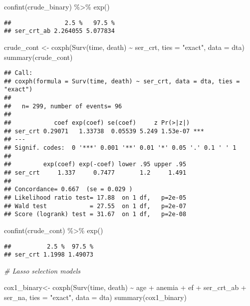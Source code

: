 \documentclass[
]{article}
\newenvironment{Shaded}{\begin{snugshade}}{\end{snugshade}}
\newcommand{\AttributeTok}[1]{\textcolor[rgb]{0.77,0.63,0.00}{#1}}
\newcommand{\CommentTok}[1]{\textcolor[rgb]{0.56,0.35,0.01}{\textit{#1}}}
\newcommand{\FunctionTok}[1]{\textcolor[rgb]{0.00,0.00,0.00}{#1}}
\newcommand{\NormalTok}[1]{#1}
\newcommand{\OtherTok}[1]{\textcolor[rgb]{0.56,0.35,0.01}{#1}}
\newcommand{\SpecialCharTok}[1]{\textcolor[rgb]{0.00,0.00,0.00}{#1}}
\newcommand{\StringTok}[1]{\textcolor[rgb]{0.31,0.60,0.02}{#1}}
\begin{document}
\begin{Shaded}
\begin{Highlighting}[]
\FunctionTok{confint}\NormalTok{(crude\_binary) }\SpecialCharTok{\%\textgreater{}\%} \FunctionTok{exp}\NormalTok{()}
\end{Highlighting}
\end{Shaded}

\begin{verbatim}
##               2.5 %   97.5 %
## ser_crt_ab 2.264055 5.077834
\end{verbatim}

\begin{Shaded}
\begin{Highlighting}[]
\NormalTok{crude\_cont }\OtherTok{\textless{}{-}} \FunctionTok{coxph}\NormalTok{(}\FunctionTok{Surv}\NormalTok{(time, death) }\SpecialCharTok{\textasciitilde{}}\NormalTok{ ser\_crt, }\AttributeTok{ties =} \StringTok{"exact"}\NormalTok{, }\AttributeTok{data =}\NormalTok{ dta)}
\FunctionTok{summary}\NormalTok{(crude\_cont)}
\end{Highlighting}
\end{Shaded}

\begin{verbatim}
## Call:
## coxph(formula = Surv(time, death) ~ ser_crt, data = dta, ties = "exact")
## 
##   n= 299, number of events= 96 
## 
##            coef exp(coef) se(coef)     z Pr(>|z|)    
## ser_crt 0.29071   1.33738  0.05539 5.249 1.53e-07 ***
## ---
## Signif. codes:  0 '***' 0.001 '**' 0.01 '*' 0.05 '.' 0.1 ' ' 1
## 
##         exp(coef) exp(-coef) lower .95 upper .95
## ser_crt     1.337     0.7477       1.2     1.491
## 
## Concordance= 0.667  (se = 0.029 )
## Likelihood ratio test= 17.88  on 1 df,   p=2e-05
## Wald test            = 27.55  on 1 df,   p=2e-07
## Score (logrank) test = 31.67  on 1 df,   p=2e-08
\end{verbatim}

\begin{Shaded}
\begin{Highlighting}[]
\FunctionTok{confint}\NormalTok{(crude\_cont) }\SpecialCharTok{\%\textgreater{}\%} \FunctionTok{exp}\NormalTok{()}
\end{Highlighting}
\end{Shaded}

\begin{verbatim}
##          2.5 %  97.5 %
## ser_crt 1.1998 1.49073
\end{verbatim}

\begin{Shaded}
\begin{Highlighting}[]
\CommentTok{\# Lasso selection models}

\NormalTok{cox1\_binary}\OtherTok{\textless{}{-}} \FunctionTok{coxph}\NormalTok{(}\FunctionTok{Surv}\NormalTok{(time, death) }\SpecialCharTok{\textasciitilde{}}\NormalTok{ age }\SpecialCharTok{+}\NormalTok{ anemia }\SpecialCharTok{+}\NormalTok{ ef }\SpecialCharTok{+}\NormalTok{ ser\_crt\_ab }\SpecialCharTok{+}\NormalTok{ ser\_na, }\AttributeTok{ties =} \StringTok{"exact"}\NormalTok{, }\AttributeTok{data =}\NormalTok{ dta)}
\FunctionTok{summary}\NormalTok{(cox1\_binary)}
\end{Highlighting}
\end{Shaded}
\end{document}
